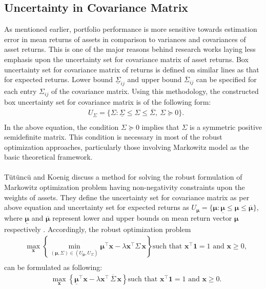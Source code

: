 \documentclass[a4paper,12pt,twoside]{article}
\begin{document}
\subsection{Uncertainty in Covariance Matrix}
As mentioned earlier, portfolio performance is more sensitive towards estimation error in mean returns of assets in comparison to variances and covariances of asset returns. This is one of the major reasons behind research works laying less emphasis upon the uncertainty set for covariance matrix of asset returns. Box uncertainty set for covariance matrix of returns is defined on similar lines as that for expected returns. Lower bound $\underline{\Sigma}_{ij}$ and upper bound $\overline{\Sigma}_{ij}$ can be specified for each entry $\Sigma_{ij}$ of the covariance matrix. Using this methodology, the constructed box uncertainty set for covariance matrix is of the following form:
\begin{equation}
\begin{split}
& U_{\Sigma}= \{\Sigma: \underline{\Sigma} \leq \Sigma \leq \overline{\Sigma}, \ \Sigma \succeq 0 \}. \\
\end{split}
\end{equation}
In the above equation, the condition $\Sigma \succeq 0$ implies that $\Sigma$ is a symmetric positive semidefinite matrix. This condition is necessary in most of the robust optimization approaches, particularly those involving Markowitz model as the basic theoretical framework. \\\\
Tütüncü and Koenig \cite{tutuncu} discuss a method for solving the robust formulation of Markowitz optimization problem having non-negativity constraints upon the weights of assets. They define the uncertainty set for covariance matrix as per above equation and uncertainty set for expected returns as $U_{\boldsymbol{\mu}}= \{\boldsymbol{\mu}: \underline{\boldsymbol{\mu}} \leq \boldsymbol{\mu} \leq \overline{\boldsymbol{\mu}} \}$, where $\underline{\boldsymbol{\mu}}$ and $\overline{\boldsymbol{\mu}}$ represent lower and upper bounds on mean return vector $\boldsymbol{\mu}$ respectively . Accordingly, the robust optimization problem 
\begin{equation}
\begin{split}
& \max_{\mathbf{x}} \left\{ \min_{ (\boldsymbol{\mu},\Sigma) \in (U_{\boldsymbol{\mu}},U_{\Sigma})} \boldsymbol{\mu}^{\top} \mathbf{x} - \lambda \mathbf{x^{\top}}\Sigma \, \mathbf{x} \right\} \text{such that } \mathbf{x^{\top}} \mathbf{1}  = 1 \text{ and } \mathbf{x} \geq 0,  \\
\end{split}
\end{equation}
can be formulated as following:
\begin{equation}
\begin{split}
& \max_{\mathbf{x}} \left\{ \underline{\boldsymbol{\mu}}^{\top} \mathbf{x} - \lambda \mathbf{x^{\top}} \, \overline{\Sigma} \, \mathbf{x} \right\} \text{such that } \mathbf{x^{\top}} \mathbf{1}  = 1 \text{ and } \mathbf{x} \geq 0.  \\
\end{split}
\end{equation}
\end{document}

